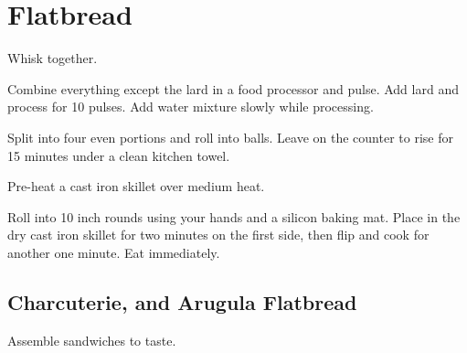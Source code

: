 \section{Flatbread}
\begin{recipe}



Whisk together.


Combine everything except the lard in a food processor and pulse.
Add lard and process for 10 pulses. Add water mixture slowly while processing.

Split into four even portions and roll into balls. Leave on the counter to rise
for 15 minutes under a clean kitchen towel.

Pre-heat a cast iron skillet over medium heat.

Roll into 10 inch rounds using your hands and a silicon baking mat. Place in
the dry cast iron skillet for two minutes on the first side, then flip and
cook for another one minute. Eat immediately.

\subsection{Charcuterie, and Arugula Flatbread}


Assemble sandwiches to taste.

\end{recipe}
